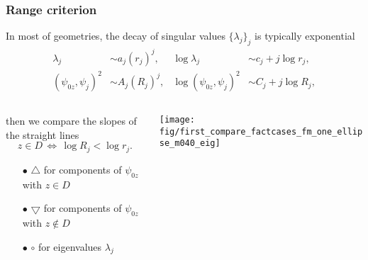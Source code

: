 \documentclass[10pt]{beamer}
\theoremstyle{plain}
\theoremstyle{plain}
\begin{document}
\begin{frame}
\frametitle{Range criterion}
In most of geometries, the decay of singular values $\bigl\{\lambda_j\bigr\}_j$ is typically exponential
\begin{align}
 \lambda_j &\sim a_j (r_j) ^j,  & \log\lambda_j &\sim c_j + j\log r_j,\label{eq:straightline-eig}\\
 (\psi_{0z}, \psi_j)^2 &\sim A_j(R_j)^j, & \log(\psi_{0z}, \psi_j)^2 &\sim C_j + j\log R_j\label{eq:straightline-data},
\end{align}
\vspace{0.1cm}
\begin{columns}[T]
\begin{column}{0.42\textwidth}
\vspace{0.1cm}
then we compare the slopes of the straight lines
\begin{equation*}
 z\in D \,\Longleftrightarrow\,
 \log R_j < \log r_j.
\end{equation*}
{
\scriptsize
\begin{itemize}
 \item[$\bullet$] $\bigtriangleup$ for components of $\psi_{0z}$ with $z\in D$
 \item[$\bullet$] $\bigtriangledown$ for components of $\psi_{0z}$ with $z\notin D$
 \item[$\bullet$] $\circ$ for eigenvalues $\lambda_j$
\end{itemize}
}
\end{column}
\begin{column}{0.6\textwidth}
\centering
\texttt{[image: fig/first\_compare\_factcases\_fm\_one\_ellipse\_m040\_eig]}
\end{column}
\end{columns}
\end{frame}
\end{document}
